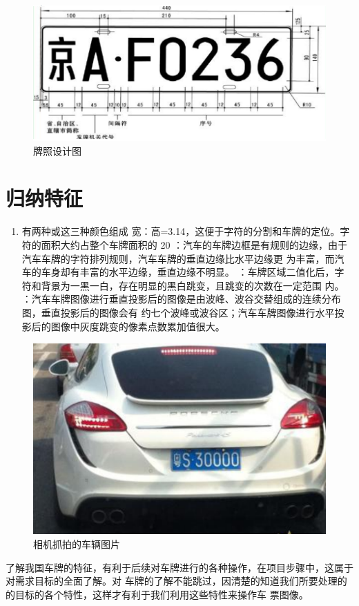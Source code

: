 \begin{figure}[h]
	\centering
	\includegraphics[scale=0.5]{figures/4.png}
	\caption{牌照设计图}
	\label{fig:1}
\end{figure}


\section{归纳特征}
\begin{enumerate}
	\item 有两种或这三种颜色组成
	 宽：高=3.14，这便于字符的分割和车牌的定位。字符的面积大约占整个车牌面积的
	20%
	：汽车的车牌边框是有规则的边缘，由于汽车车牌的字符排列规则，汽车车牌的垂直边缘比水平边缘更
	为丰富，而汽车的车身却有丰富的水平边缘，垂直边缘不明显。
	：车牌区域二值化后，字符和背景为一黑一白，存在明显的黑白跳变，且跳变的次数在一定范围
	内。
	：汽车车牌图像进行垂直投影后的图像是由波峰、波谷交替组成的连续分布图，垂直投影后的图像会有
	约七个波峰或波谷区；汽车车牌图像进行水平投影后的图像中灰度跳变的像素点数累加值很大。
\end{enumerate}
\begin{figure}[h]
	\centering
	\includegraphics[scale=0.5]{figures/1.png}
	\caption{相机抓拍的车辆图片}
	\label{fig:1}
\end{figure}

了解我国车牌的特征，有利于后续对车牌进行的各种操作，在项目步骤中，这属于对需求目标的全面了解。对
车牌的了解不能跳过，因清楚的知道我们所要处理的的目标的各个特性，这样才有利于我们利用这些特性来操作车
票图像。
